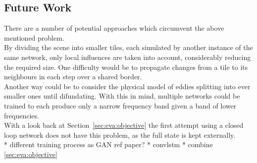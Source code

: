 \documentclass[sigconf]{acmart}
\begin{document}
\subsection{Future Work}
There are a number of potential approaches which circumvent the above mentioned problem. \\
By dividing the scene into smaller tiles, each simulated by another instance of the same network, only local influences are taken into account, considerably reducing the required size. One difficulty would be to propagate changes from a tile to its neighbours in each step over a shared border.\\
Another way could be to consider the physical model of eddies splitting into ever smaller ones until difundating.
With this in mind, multiple networks could be trained to each produce only a narrow frequency band given a band of lower frequencies. \\
With a look back at Section~\ref{sec:eva:objective} the first attempt using a closed loop network does not have this problem, as the full state is kept externally. \\
* different training process as GAN ref paper?
* convlstm
* combine \ref{sec:eva:objective}


%

\end{document}
